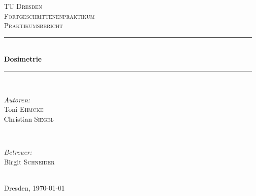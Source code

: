\begin{titlepage}
\newcommand{\HRule}{\rule{\linewidth}{0.5mm}} %

\center %
 

\textsc{\LARGE TU Dresden}\\[1.5cm] %
\textsc{\Large Fortgeschrittenenpraktikum}\\[0.5cm] %
\textsc{\Large Praktikumsbericht}\\[0.5cm] %


\HRule \\[0.7cm]
{ \huge \bfseries Dosimetrie}\\[0.4cm] %
\HRule \\[1.5cm]
 

\begin{minipage}{0.4\textwidth}
\begin{flushleft} \large
\emph{Autoren:}\\
Toni \textsc{Ehmcke}\\
Christian \textsc{Siegel}
\end{flushleft}
\end{minipage}
~
\begin{minipage}{0.4\textwidth}
\begin{flushright} \large
\emph{Betreuer:} \\
Birgit \textsc{Schneider} %
\end{flushright}
\end{minipage}\\[4cm]


{\large Dresden, \today}\\[3cm] %

\vfill 

\end{titlepage}